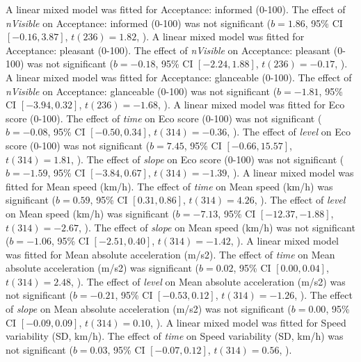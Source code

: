 A linear mixed model was fitted for Acceptance: informed (0-100).
The effect of \textit{nVisible} on Acceptance: informed (0-100) was not significant ($b = 1.86$, 95\% CI $[-0.16, 3.87]$, $t(236) = 1.82$, ).
A linear mixed model was fitted for Acceptance: pleasant (0-100).
The effect of \textit{nVisible} on Acceptance: pleasant (0-100) was not significant ($b = -0.18$, 95\% CI $[-2.24, 1.88]$, $t(236) = -0.17$, ).
A linear mixed model was fitted for Acceptance: glanceable (0-100).
The effect of \textit{nVisible} on Acceptance: glanceable (0-100) was not significant ($b = -1.81$, 95\% CI $[-3.94, 0.32]$, $t(236) = -1.68$, ).
A linear mixed model was fitted for Eco score (0-100).
The effect of \textit{time} on Eco score (0-100) was not significant ($b = -0.08$, 95\% CI $[-0.50, 0.34]$, $t(314) = -0.36$, ).
The effect of \textit{level} on Eco score (0-100) was not significant ($b = 7.45$, 95\% CI $[-0.66, 15.57]$, $t(314) = 1.81$, ).
The effect of \textit{slope} on Eco score (0-100) was not significant ($b = -1.59$, 95\% CI $[-3.84, 0.67]$, $t(314) = -1.39$, ).
A linear mixed model was fitted for Mean speed (km/h).
The effect of \textit{time} on Mean speed (km/h) was significant ($b = 0.59$, 95\% CI $[0.31, 0.86]$, $t(314) = 4.26$, ).
The effect of \textit{level} on Mean speed (km/h) was significant ($b = -7.13$, 95\% CI $[-12.37, -1.88]$, $t(314) = -2.67$, ).
The effect of \textit{slope} on Mean speed (km/h) was not significant ($b = -1.06$, 95\% CI $[-2.51, 0.40]$, $t(314) = -1.42$, ).
A linear mixed model was fitted for Mean absolute acceleration (m/s2).
The effect of \textit{time} on Mean absolute acceleration (m/s2) was significant ($b = 0.02$, 95\% CI $[0.00, 0.04]$, $t(314) = 2.48$, ).
The effect of \textit{level} on Mean absolute acceleration (m/s2) was not significant ($b = -0.21$, 95\% CI $[-0.53, 0.12]$, $t(314) = -1.26$, ).
The effect of \textit{slope} on Mean absolute acceleration (m/s2) was not significant ($b = 0.00$, 95\% CI $[-0.09, 0.09]$, $t(314) = 0.10$, ).
A linear mixed model was fitted for Speed variability (SD, km/h).
The effect of \textit{time} on Speed variability (SD, km/h) was not significant ($b = 0.03$, 95\% CI $[-0.07, 0.12]$, $t(314) = 0.56$, ).
